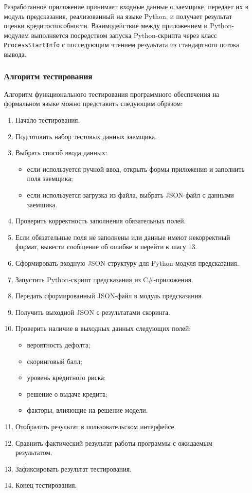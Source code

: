 Разработанное приложение принимает входные данные о заемщике, передает их в модуль предсказания, реализованный на языке Python, и получает результат оценки кредитоспособности. Взаимодействие между приложением и Python-модулем выполняется посредством запуска Python-скрипта через класс \texttt{ProcessStartInfo} с последующим чтением результата из стандартного потока вывода.

\subsubsection{Алгоритм тестирования}

Алгоритм функционального тестирования программного обеспечения на формальном языке можно представить следующим образом:

\begin{enumerate}
  \item Начало тестирования.
  \item Подготовить набор тестовых данных заемщика.
  \item Выбрать способ ввода данных:
        \begin{itemize}
          \item если используется ручной ввод, открыть формы приложения и заполнить поля заемщика;
          \item если используется загрузка из файла, выбрать JSON-файл с данными заемщика.
        \end{itemize}
  \item Проверить корректность заполнения обязательных полей.
  \item Если обязательные поля не заполнены или данные имеют некорректный формат, вывести сообщение об ошибке и перейти к шагу 13.
  \item Сформировать входную JSON-структуру для Python-модуля предсказания.
  \item Запустить Python-скрипт предсказания из C\#-приложения.
  \item Передать сформированный JSON-файл в модуль предсказания.
  \item Получить выходной JSON с результатами скоринга.
  \item Проверить наличие в выходных данных следующих полей:
        \begin{itemize}
          \item вероятность дефолта;
          \item скоринговый балл;
          \item уровень кредитного риска;
          \item решение о выдаче кредита;
          \item факторы, влияющие на решение модели.
        \end{itemize}
  \item Отобразить результат в пользовательском интерфейсе.
  \item Сравнить фактический результат работы программы с ожидаемым результатом.
  \item Зафиксировать результат тестирования.
  \item Конец тестирования.
\end{enumerate}

